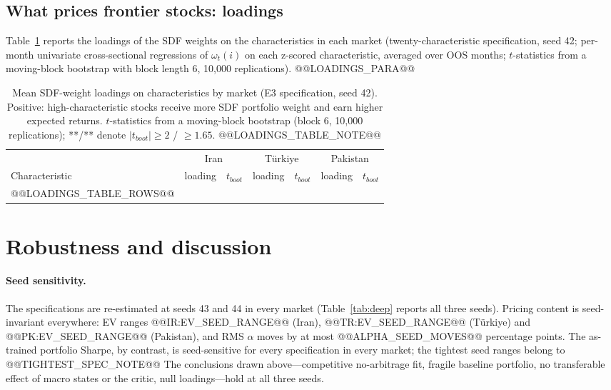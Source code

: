 \documentclass[12pt]{article}
\begin{document}
\subsection{What prices frontier stocks: loadings}\label{sec:loadings}

Table~\ref{tab:loadings} reports the loadings of the SDF weights on the characteristics in each market (twenty-characteristic specification, seed 42; per-month univariate cross-sectional regressions of $\omega_t(i)$ on each z-scored characteristic, averaged over OOS months; $t$-statistics from a moving-block bootstrap with block length 6, 10{,}000 replications). @@LOADINGS_PARA@@

\begin{table}[htbp]
\centering
\footnotesize
\setlength{\tabcolsep}{4pt}
\caption{Mean SDF-weight loadings on characteristics by market (E3 specification, seed 42). Positive: high-characteristic stocks receive more SDF portfolio weight and earn higher expected returns. $t$-statistics from a moving-block bootstrap (block 6, 10{,}000 replications); **/** denote $|t_{boot}|\ge 2$ / $\ge 1.65$. @@LOADINGS_TABLE_NOTE@@}
\label{tab:loadings}
\begin{tabular}{l cc cc cc}
\toprule
 & \multicolumn{2}{c}{Iran} & \multicolumn{2}{c}{T\"urkiye} & \multicolumn{2}{c}{Pakistan} \\
\cmidrule(lr){2-3}\cmidrule(lr){4-5}\cmidrule(lr){6-7}
Characteristic & loading & $t_{boot}$ & loading & $t_{boot}$ & loading & $t_{boot}$ \\
\midrule
@@LOADINGS_TABLE_ROWS@@
\bottomrule
\end{tabular}
\end{table}

\section{Robustness and discussion}\label{sec:robust}

\paragraph{Seed sensitivity.} The specifications are re-estimated at seeds 43 and 44 in every market (Table~\ref{tab:deep} reports all three seeds). Pricing content is seed-invariant everywhere: EV ranges @@IR:EV_SEED_RANGE@@ (Iran), @@TR:EV_SEED_RANGE@@ (T\"urkiye) and @@PK:EV_SEED_RANGE@@ (Pakistan), and RMS $\alpha$ moves by at most @@ALPHA_SEED_MOVES@@ percentage points. The as-trained portfolio Sharpe, by contrast, is seed-sensitive for every specification in every market; the tightest seed ranges belong to @@TIGHTEST_SPEC_NOTE@@ The conclusions drawn above---competitive no-arbitrage fit, fragile baseline portfolio, no transferable effect of macro states or the critic, null loadings---hold at all three seeds.
\end{document}
